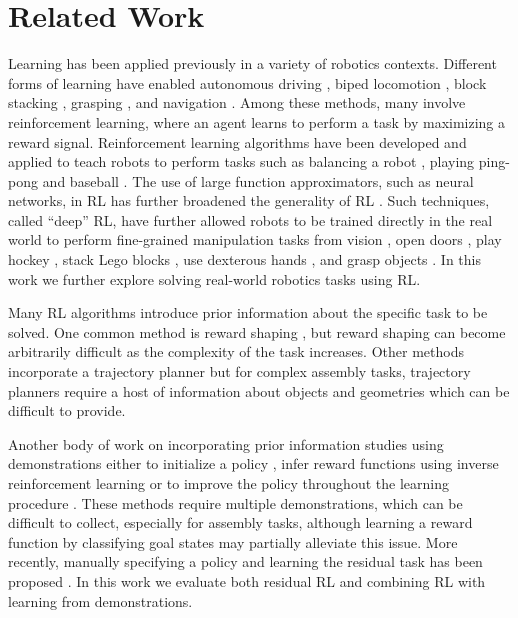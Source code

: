 \section{Related Work}\label{sec:relatedwork}

Learning has been applied previously in a variety of robotics contexts. Different forms of learning have enabled autonomous driving \citep{pomerleau1989alvinn}, biped locomotion \citep{nakanishi2004bipedlfd}, block stacking \citep{deisenroth2011stacking}, grasping \citep{pinto2015supersizing}, and navigation \citep{giusti15trails, pathak2018zeroshot}. Among these methods, many involve reinforcement learning, where an agent learns to perform a task by maximizing a reward signal. Reinforcement learning algorithms have been developed and applied to teach robots to perform tasks such as balancing a robot \citep{deisenroth2011pilco}, playing ping-pong \citep{peters2010reps} and baseball \citep{peters2008baseball}.
The use of large function approximators, such as neural networks, in RL has further broadened the generality of RL \citep{mnih2013atari}. Such techniques, called ``deep'' RL, have further allowed robots to be trained directly in the real world to perform fine-grained manipulation tasks from vision \citep{levine2016gps}, open doors \citep{gu2016naf}, play hockey \citep{chebotar2017pilqr}, stack Lego blocks \citep{zhang2019solar}, use dexterous hands \citep{zhu2019hands}, and grasp objects \citep{kalashnikov2018qtopt}. In this work we further explore solving real-world robotics tasks using RL.

Many RL algorithms introduce prior information about the specific task to be solved. One common method is reward shaping \citep{ng1999rewardshaping}, but reward shaping can become arbitrarily difficult as the complexity of the task increases. Other methods incorporate a trajectory planner \citep{thomas2018cad} but for complex assembly tasks, trajectory planners require a host of information about objects and geometries which can be difficult to provide.

Another body of work on incorporating prior information studies using  demonstrations either to initialize a policy \citep{peters2008baseball, kober2008mp}, infer reward functions using inverse reinforcement learning \citep{finn16guidedcostlearning, ziebart2008maxent} or to improve the policy throughout the learning procedure \citep{hester17dqfd, nair2018demonstrations, rajeswaran2018dextrous}. These methods require multiple demonstrations, which can be difficult to collect, especially for assembly tasks, although learning a reward function by classifying goal states \citep{singh2019raq} may partially alleviate this issue. More recently, manually specifying a policy and learning the residual task has been proposed \citep{johannink18residualrl, silver18residualpolicylearning}. In this work we evaluate both residual RL and combining RL with learning from demonstrations.

